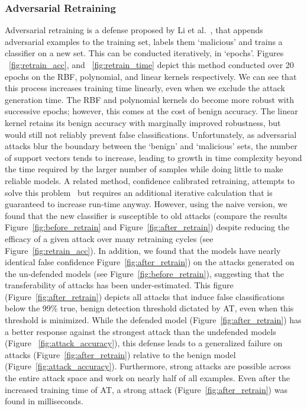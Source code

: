 \documentclass[fonts]{icst}
\begin{document}
\subsubsection{Adversarial Retraining}
Adversarial retraining is a defense proposed by  Li et al.~\cite{li2016general}, that appends adversarial examples to the training set, labels them `malicious' and trains a classifier on a new set. This can be conducted iteratively, in `epochs'. Figures ~\ref{fig:retrain_acc}, and ~\ref{fig:retrain_time} depict this method conducted over 20 epochs on the RBF, polynomial, and linear kernels respectively. We can see that this process increases training time linearly, even when we exclude the attack generation time. The RBF and polynomial kernels do become more robust with successive epochs; however, this comes at the cost of benign accuracy. The linear kernel retains its benign accuracy with marginally improved robustness, but would still not reliably prevent false classifications. Unfortunately, as adversarial attacks blur the boundary between the `benign' and `malicious' sets, the number of support vectors tends to increase, leading to growth in time complexity beyond the time required by the larger number of samples while doing little to make reliable models.
A related method, confidence calibrated retraining, attempts to solve this problem~\cite{croce2020reliable} but requires an additional iterative calculation that is guaranteed to increase run-time anyway. However, using the naive version, we found that the new classifier is susceptible to old attacks (compare the results Figure~\ref{fig:before_retrain} and Figure~\ref{fig:after_retrain}) despite reducing the efficacy of a given attack over many retraining cycles (see Figure~\ref{fig:retrain_acc}). In addition, we found that the models have nearly identical false confidence Figure~\ref{fig:after_retrain}) on the attacks generated on the un-defended models (see Figure~\ref{fig:before_retrain}), suggesting that the transferability of attacks has been under-estimated. This figure (Figure~\ref{fig:after_retrain}) depicts all attacks that induce false classifications below the 99\% true, benign detection threshold dictated by AT, even when this threshold is minimized. While the defended model (Figure~\ref{fig:after_retrain}) has a better response against the strongest attack  than the undefended models (Figure ~\ref{fig:attack_accuracy}), this defense leads to a generalized failure on attacks (Figure~\ref{fig:after_retrain}) relative to the benign model (Figure~\ref{fig:attack_accuracy}). Furthermore, strong attacks are possible across the entire attack space and work on nearly half of all examples. Even after the increased training time of AT, a strong attack  (Figure~\ref{fig:after_retrain}) was found in milliseconds.
\end{document}

